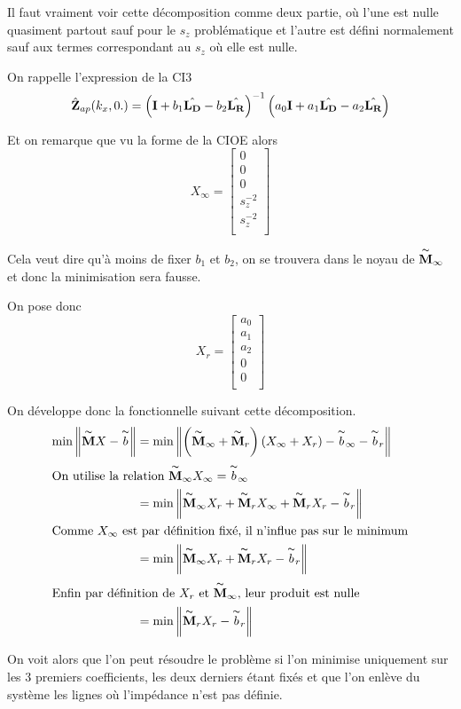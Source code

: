 Il faut vraiment voir cette décomposition comme deux partie, où l'une est nulle quasiment partout sauf pour le \(s_z\) problématique et l'autre est défini normalement sauf aux termes correspondant au \(s_z\) où elle est nulle.

On rappelle l'expression de la CI3
\begin{equation}
  \hat{\mathbf{Z}}_{ap}(k_x,0.) = \left(\mathbf{I} + b_1 \hat{\mathbf{L_D}} - b_2 \hat{\mathbf{L_R}} \right)^{-1}\left(a_0\mathbf{I} + a_1 \hat{\mathbf{L_D}} - a_2 \hat{\mathbf{L_R}} \right)
\end{equation}

Et on remarque que vu la forme de la CIOE alors
\begin{equation}
  X_\infty = \begin{bmatrix}
    0\\
    0\\
    0\\
    s_z^{-2}\\
    s_z^{-2}\\
  \end{bmatrix}
\end{equation}

Cela veut dire qu'à moins de fixer \(b_1\) et \(b_2\), on se trouvera dans le noyau de \(\overset{\thicksim}{\mathbf{M}}_\infty\) et donc la minimisation sera fausse.

On pose donc 
\begin{equation}
  X_r = \begin{bmatrix}
  a_0\\
  a_1\\
  a_2\\
  0\\
  0\\
  \end{bmatrix}
\end{equation}

On développe donc la fonctionnelle suivant cette décomposition.
\begin{align*}
\min\left\rVert \overset{\thicksim}{\mathbf{M}} X - \overset{\thicksim}{b} \right \rVert &= \min\left\rVert \left(\overset{\thicksim}{\mathbf{M}}_\infty + \overset{\thicksim}{\mathbf{M}}_r\right)\left( X_\infty + X_r \right) - \overset{\thicksim}{b}_\infty - \overset{\thicksim}{b}_r \right \rVert
\\
\intertext{On utilise la relation \(  \overset{\thicksim}{\mathbf{M}}_\infty X_\infty = \overset{\thicksim}{b}_\infty\)}
&=  \min \left\rVert \overset{\thicksim}{\mathbf{M}}_\infty X_r + \overset{\thicksim}{\mathbf{M}}_r X_\infty + \overset{\thicksim}{\mathbf{M}}_r X_r - \overset{\thicksim}{b}_r \right \rVert
\\
\intertext{Comme \(X_\infty\) est par définition fixé, il n'influe pas sur le minimum}
&= \min \left\rVert \overset{\thicksim}{\mathbf{M}}_\infty X_r + \overset{\thicksim}{\mathbf{M}}_r X_r - \overset{\thicksim}{b}_r \right \rVert
\\
\intertext{Enfin par définition de \(X_r\) et \(\overset{\thicksim}{\mathbf{M}}_\infty\), leur produit est nulle}
&= \min \left\rVert \overset{\thicksim}{\mathbf{M}}_r X_r - \overset{\thicksim}{b}_r \right \rVert
\end{align*}

On voit alors que l'on peut résoudre le problème si l'on minimise uniquement sur les 3 premiers coefficients, les deux derniers étant fixés et que l'on enlève du système les lignes où l'impédance n'est pas définie.
